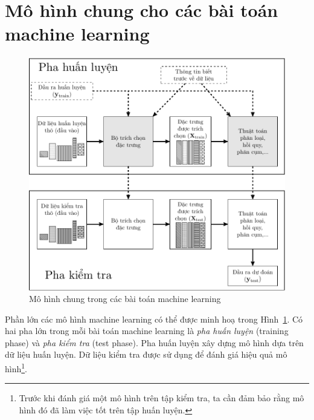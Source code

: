 \section{Mô hình chung cho các bài toán machine learning }
\begin{figure}[t]
\centering
    \includegraphics[width = \textwidth]{Chapters/01_Overview/11_featureengineering/latex/ML_models2.pdf}
    \caption[]{Mô hình chung trong các bài toán machine learning}
    \label{fig:11_1}
\end{figure}



Phần lớn các mô hình machine learning có thể được minh hoạ trong
Hình~\ref{fig:11_1}. Có hai pha lớn trong mỗi bài toán machine learning là
\textit{pha huấn luyện} (training phase) và \textit{pha kiểm tra} (test phase). Pha huấn luyện xây dựng mô
hình dựa trên dữ liệu huấn luyện. Dữ liệu kiểm tra được sử dụng để đánh giá
hiệu quả mô hình\footnote{Trước khi đánh giá một mô hình trên tập kiểm tra, ta
cần đảm bảo rằng mô hình đó đã làm việc tốt trên tập huấn luyện.}.

